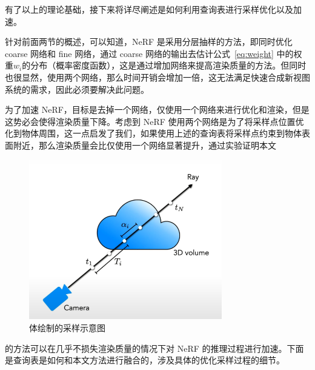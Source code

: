 
有了以上的理论基础，接下来将详尽阐述是如何利用查询表进行采样优化以及加速。

针对前面两节的概述，可以知道，NeRF 是采用分层抽样的方法，即同时优化 coarse 网络和 fine 网络，通过 coarse 网络的输出去估计公式~\ref{eq:weight} 中的权重$\displaystyle w_i$的分布（概率密度函数），这是通过增加网络来提高渲染质量的方法。但同时也很显然，使用两个网络，那么时间开销会增加一倍，这无法满足快速合成新视图系统的需求，因此必须要解决此问题。

为了加速 NeRF，目标是去掉一个网络，仅使用一个网络来进行优化和渲染，但是这势必会使得渲染质量下降。考虑到 NeRF 使用两个网络是为了将采样点位置优化到物体周围，这一点启发了我们，如果使用上述的查询表将采样点约束到物体表面附近，那么渲染质量会比仅使用一个网络显著提升，通过实验证明本文\begin{figure}[b]
	\centering
	\includegraphics[width=0.75\textwidth]{figures/cloud.jpg}
	\caption{体绘制的采样示意图}
	\label{fig:cloud}
\end{figure}\pagebreak 的方法可以在几乎不损失渲染质量的情况下对 NeRF 的推理过程进行加速。下面是查询表是如何和本文方法进行融合的，涉及具体的优化采样过程的细节。



